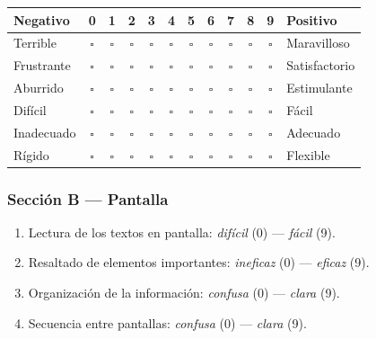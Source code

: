 \documentclass[12pt, a4paper]{article}
\begin{document}
\begin{table}[H]
  \centering
  \renewcommand{\arraystretch}{1.4}
  \begin{tabular}{p{4.5cm} c c c c c c c c c c p{4.5cm}}
    \toprule
    \textbf{Negativo} & 0 & 1 & 2 & 3 & 4 & 5 & 6 & 7 & 8 & 9 & \textbf{Positivo} \\
    \midrule
    Terrible          & $\square$ & $\square$ & $\square$ & $\square$ & $\square$ & $\square$ & $\square$ & $\square$ & $\square$ & $\square$ & Maravilloso \\
    Frustrante        & $\square$ & $\square$ & $\square$ & $\square$ & $\square$ & $\square$ & $\square$ & $\square$ & $\square$ & $\square$ & Satisfactorio \\
    Aburrido          & $\square$ & $\square$ & $\square$ & $\square$ & $\square$ & $\square$ & $\square$ & $\square$ & $\square$ & $\square$ & Estimulante \\
    Difícil           & $\square$ & $\square$ & $\square$ & $\square$ & $\square$ & $\square$ & $\square$ & $\square$ & $\square$ & $\square$ & Fácil \\
    Inadecuado        & $\square$ & $\square$ & $\square$ & $\square$ & $\square$ & $\square$ & $\square$ & $\square$ & $\square$ & $\square$ & Adecuado \\
    Rígido            & $\square$ & $\square$ & $\square$ & $\square$ & $\square$ & $\square$ & $\square$ & $\square$ & $\square$ & $\square$ & Flexible \\
    \bottomrule
  \end{tabular}
\end{table}

\subsubsection{Sección B — Pantalla}

\begin{enumerate}[leftmargin=1.5cm, itemsep=4pt]
  \item Lectura de los textos en pantalla: \textit{difícil} (0) — \textit{fácil} (9).
  \item Resaltado de elementos importantes: \textit{ineficaz} (0) — \textit{eficaz} (9).
  \item Organización de la información: \textit{confusa} (0) — \textit{clara} (9).
  \item Secuencia entre pantallas: \textit{confusa} (0) — \textit{clara} (9).
\end{enumerate}
\end{document}
